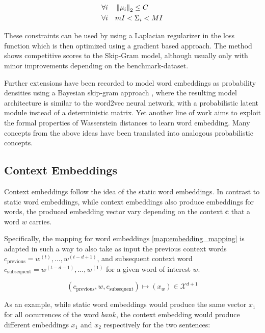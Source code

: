 \documentclass[a4paper,12pt,twoside,openright]{report}
\begin{document}
\begin{align}
\forall i \quad & \left\lVert \mu_i \right\rVert_2  \leq C\\
\forall i \quad & m I <  \Sigma_i < M I
\end{align}

These constraints can be used by using a Laplacian regularizer in the loss function which is then optimized using a gradient based approach. 
The method shows competitive scores to the Skip-Gram model, although usually only with minor improvements depending on the benchmark-dataset.

Further extensions have been recorded to model word embeddings as probability densities using a Bayesian skip-gram approach \cite{brazinskas19}, where the resulting model architecture is similar to the word2vec neural network, with a probabilistic latent module instead of a deterministic matrix.
Yet another line of work \cite{yan19} aims to exploit the formal properties of Wasserstein distances to learn word embedding.
Many concepts from the above ideas have been translated into analogous probabilistic concepts.

\newpage
\subsection{Context Embeddings}

Context embeddings follow the idea of the static word embeddings.
In contrast to static word embeddings, while context embeddings also produce embeddings for words, the produced embedding vector vary depending on the context $\mathbf{c}$ that a word $w$ carries.

Specifically, the mapping for word embeddings \eqref{map:embedding_mapping} is adapted in such a way to also take as input the previous context words $c_\text{previous} = w^{(t)}, \ldots, w^{(t-d + 1)}$, and subsequent context word $c_\text{subsequent} = w^{(t-d - 1)}, \ldots, w^{(1)}$ for a given word of interest $w$.

\begin{equation}
(c_\text{previous}, w, c_\text{subsequent}) \mapsto (x_w) \in \mathcal{X}^{d + 1}
\end{equation}{\label{map:context_embedding_mapping}}

As an example, while static word embeddings would produce the same vector $x_1$ for all occurrences of the word $bank$, the context embedding would produce different embeddings $x_1$ and $x_2$ respectively for the two sentences:
\end{document}

